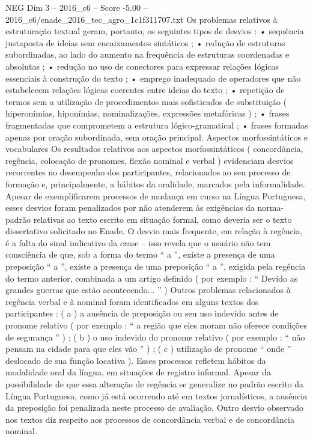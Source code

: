 \begin{textsample}{NEG Dim 3 – 2016\_c6 – Score -5.00 – 2016\_c6/enade\_2016\_tec\_agro\_1c1f311707.txt}
Os problemas relativos à estruturação textual geram, portanto, os seguintes tipos de desvios : • sequência justaposta de ideias sem encaixamentos sintáticos ; • redução de estruturas subordinadas, ao lado do aumento na frequência de estruturas coordenadas e absolutas ; • redução no uso de conectores para expressar relações lógicas essenciais à construção do texto ; • emprego inadequado de operadores que não estabelecem relações lógicas coerentes entre ideias do texto ; • repetição de termos sem a utilização de procedimentos mais sofisticados de substituição ( hiperonímias, hiponímias, nominalizações, expressões metafóricas ) ; • frases fragmentadas que comprometem a estrutura lógico-gramatical ; • frases formadas apenas por oração subordinada, sem oração principal.
Aspectos morfossintáticos e vocabulares Os resultados relativos aos aspectos morfossintáticos ( concordância, regência, colocação de pronomes, flexão nominal e verbal ) evidenciam desvios recorrentes no desempenho dos participantes, relacionados ao seu processo de formação e, principalmente, a hábitos da oralidade, marcados pela informalidade.
Apesar de exemplificarem processos de mudança em curso na Língua Portuguesa, esses desvios foram penalizados por não atenderem às exigências da norma-padrão relativas ao texto escrito em situação formal, como deveria ser o texto dissertativo solicitado no Enade.
O desvio mais frequente, em relação à regência, é a falta do sinal indicativo da crase – isso revela que o usuário não tem consciência de que, sob a forma do termo “ a ”, existe a presença de uma preposição “ a ”, existe a presença de uma preposição “ a ”, exigida pela regência do termo anterior, combinada a um artigo definido ( por exemplo : “ Devido as grandes guerras que estão acontecendo... ” ) Outros problemas relacionados à regência verbal e à nominal foram identificados em alguns textos dos participantes : ( a ) a ausência de preposição ou seu uso indevido antes de pronome relativo ( por exemplo : “ a região que eles moram não oferece condições de segurança ” ) ; ( b ) o uso indevido do pronome relativo ( por exemplo : “ não pensam na cidade para que eles vão ” ) ; ( c ) utilização de pronome “ onde ” deslocado de sua função locativa ).
Esses processos refletem hábitos da modalidade oral da língua, em situações de registro informal.
Apesar da possibilidade de que essa alteração de regência se generalize no padrão escrito da Língua Portuguesa, como já está ocorrendo até em textos jornalísticos, a ausência da preposição foi penalizada neste processo de avaliação.
Outro desvio observado nos textos diz respeito aos processos de concordância verbal e de concordância nominal.

\end{textsample}
